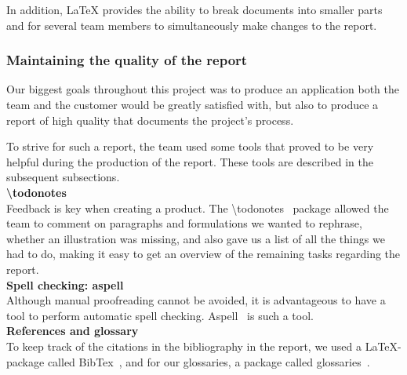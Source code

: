 In addition, LaTeX provides the ability to break documents into smaller parts and for several team members to simultaneously make changes to the report.\\

\subsubsection{Maintaining the quality of the report}
Our biggest goals throughout this project was to produce an application both the team and the customer would be greatly satisfied with, but also to produce a report of high quality that documents the project's process. 

To strive for such a report, the team used some tools that proved to be very helpful during the production of the report. These tools are described in the subsequent subsections.\\

\noindent\textbf{\textbackslash todonotes}\\
Feedback is key when creating a product. The \textbackslash todonotes~\cite{todo} package allowed the team to comment on paragraphs and formulations we wanted to rephrase, whether an illustration was missing, and also gave us a list of all the things we had to do, making it easy to get an overview of the remaining tasks regarding the report.\\

\noindent\textbf{Spell checking: aspell}\\
Although manual proofreading cannot be avoided, it is advantageous to have a tool to perform automatic spell checking. Aspell~\cite{aspell} is such a tool.\\

\noindent\textbf{References and glossary}\\
To keep track of the citations in the bibliography in the report, we used a LaTeX-package called BibTex~\cite{bibtex}, and for our glossaries, a package called glossaries~\cite{glossaries}.


